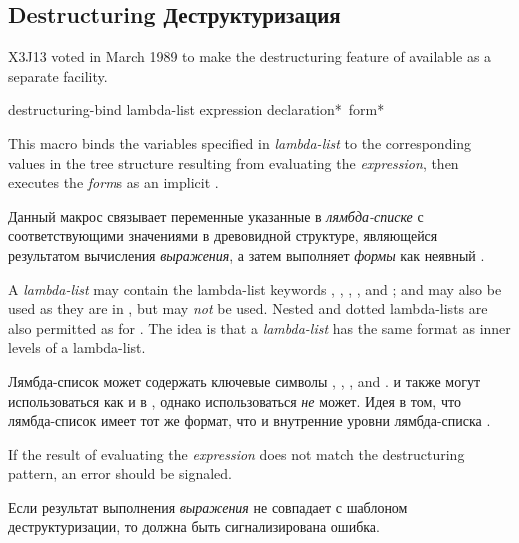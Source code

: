 \begin{newer}
\section{Destructuring Деструктуризация}

X3J13 voted in March 1989 
to make the destructuring feature of 
available as a separate facility.

\begin{defmac}
destructuring-bind lambda-list expression {declaration}* {\,form}*

   This macro binds the variables specified in \emph{lambda-list} to the corresponding
   values in the tree structure resulting from evaluating the \emph{expression},
   then executes the \emph{form\/}s as an implicit .

   Данный макрос связывает переменные указанные в \emph{лямбда-списке} с
   соответствующими значениями в древовидной структуре, являющейся результатом
   вычисления \emph{выражения}, а затем выполняет \emph{формы} как неявный .

A  \emph{lambda-list} may contain
the lambda-list keywords , , ,
, and ;  and 
may also be used as they are in , but  may
\emph{not} be used.  Nested and dotted lambda-lists are also permitted
as for .
The idea is that a  \emph{lambda-list}
has the same format as inner levels of a  lambda-list.

Лямбда-список может содержать ключевые символы , , 
, and .
 и  также могут использоваться как и в ,
однако  использоваться \emph{не} может.
Идея в том, что лямбда-список  имеет тот же формат, что
и внутренние уровни лямбда-списка .

   If the result of evaluating the \emph{expression} does not match the 
   destructuring pattern, an error should be signaled.

Если результат выполнения \emph{выражения} не совпадает с шаблоном
деструктуризации, то должна быть сигнализирована ошибка.
\end{defmac}
\end{newer}


